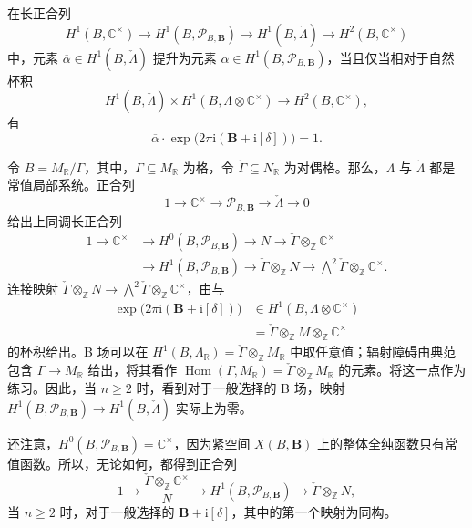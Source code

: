 \begin{proposition}\label{prop:6.60}
在长正合列
\[
H^1(B,\mathbb C^\times)\longrightarrow H^1(B,\mathcal P_{B,\mathbf B})
\longrightarrow H^1(B,\check\Lambda)\longrightarrow H^2(B,\mathbb C^\times)
\]
中，元素 $\overline\alpha\in H^1(B,\check\Lambda)$ 提升为元素 $\alpha\in H^1(B,\mathcal P_{B,\mathbf B})$，当且仅当相对于自然杯积
\[
H^1(B,\check\Lambda)\times H^1(B,\Lambda\otimes\mathbb C^\times)
\longrightarrow H^2(B,\mathbb C^\times),
\]
有
\[
\overline\alpha\cdot\exp\bigl(2\pi\mathrm i(\mathbf B+\mathrm i[\delta])\bigr)=1.
\]
\end{proposition}

\begin{example}\label{ex:6.61}
令 $B=M_{\mathbb R}/\Gamma$，其中，$\Gamma\subseteq M_{\mathbb R}$ 为格，令 $\check\Gamma\subseteq N_{\mathbb R}$ 为对偶格。那么，$\Lambda$ 与 $\check\Lambda$ 都是常值局部系统。正合列
\[
1\longrightarrow\mathbb C^\times\longrightarrow\mathcal P_{B,\mathbf B}
\longrightarrow\check\Lambda\longrightarrow0
\]
给出上同调长正合列
\[
\begin{aligned}
1\longrightarrow\mathbb C^\times
&\longrightarrow H^0(B,\mathcal P_{B,\mathbf B})
\longrightarrow N\longrightarrow\check\Gamma\otimes_{\mathbb Z}\mathbb C^\times\\
&\longrightarrow H^1(B,\mathcal P_{B,\mathbf B})
\longrightarrow\check\Gamma\otimes_{\mathbb Z}N
\longrightarrow\bigwedge^2\check\Gamma\otimes_{\mathbb Z}\mathbb C^\times.
\end{aligned}
\]
连接映射 $\check\Gamma\otimes_{\mathbb Z}N\to\bigwedge^2\check\Gamma\otimes_{\mathbb Z}\mathbb C^\times$，由与
\[
\begin{aligned}
\exp\bigl(2\pi\mathrm i(\mathbf B+\mathrm i[\delta])\bigr)
&\in H^1(B,\Lambda\otimes\mathbb C^\times)\\
&=\check\Gamma\otimes_{\mathbb Z}M\otimes_{\mathbb Z}\mathbb C^\times
\end{aligned}
\]
的杯积给出。B 场可以在 $H^1(B,\Lambda_{\mathbb R})=\check\Gamma\otimes_{\mathbb Z}M_{\mathbb R}$ 中取任意值；辐射障碍由典范包含 $\Gamma\to M_{\mathbb R}$ 给出，将其看作 $\operatorname{Hom}(\Gamma,M_{\mathbb R})=\check\Gamma\otimes_{\mathbb Z}M_{\mathbb R}$ 的元素。将这一点作为练习。因此，当 $n\geq2$ 时，看到对于一般选择的 B 场，映射 $H^1(B,\mathcal P_{B,\mathbf B})\to H^1(B,\check\Lambda)$ 实际上为零。

还注意，$H^0(B,\mathcal P_{B,\mathbf B})=\mathbb C^\times$，因为紧空间 $X(B,\mathbf B)$ 上的整体全纯函数只有常值函数。所以，无论如何，都得到正合列
\[
1\longrightarrow\frac{\check\Gamma\otimes_{\mathbb Z}\mathbb C^\times}{N}
\longrightarrow H^1(B,\mathcal P_{B,\mathbf B})
\longrightarrow\check\Gamma\otimes_{\mathbb Z}N,
\]
当 $n\geq2$ 时，对于一般选择的 $\mathbf B+\mathrm i[\delta]$，其中的第一个映射为同构。
\end{example}

